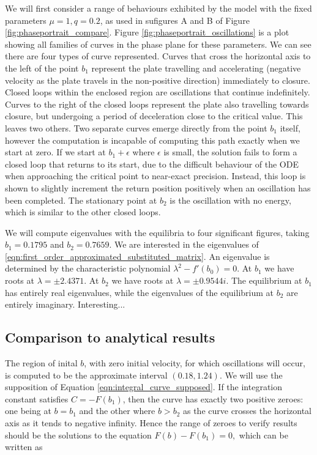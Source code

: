 \documentclass{article}
\begin{document}
We will first consider a range of behaviours exhibited by the model with the fixed parameters $\mu=1, q=0.2$,
as used in sufigures A and B of Figure \ref{fig:phaseportrait_compare}.
Figure \ref{fig:phaseportrait_oscillations} is a plot showing all families of curves in the phase plane for these parameters.
We can see there are four types of curve represented.
Curves that cross the horizontal axis to the left of the point $b_1$ represent the plate travelling and accelerating (negative velocity as the plate travels in the non-positive direction) immediately to closure.
Closed loops within the enclosed region are oscillations that continue indefinitely.
Curves to the right of the closed loops represent the plate also travelling towards closure,
but undergoing a period of deceleration close to the critical value.
This leaves two others. Two separate curves emerge directly from the point $b_1$ itself,
however the computation is incapable of computing this path exactly when we start at zero.
If we start at $b_1+\epsilon$ where $\epsilon$ is small,
the solution fails to form a closed loop that returns to its start,
due to the difficult behaviour of the ODE when approaching the critical point to near-exact precision.
Instead, this loop is shown to slightly increment the return position positively when an oscillation has been completed.
The stationary point at $b_2$ is the oscillation with no energy,
which is similar to the other closed loops.

We will compute eigenvalues with the equilibria to four significant figures, taking \(b_1 = 0.1795\) and \(b_2 = 0.7659\).
We are interested in the eigenvalues of \ref{eqn:first_order_approximated_substituted_matrix}.
An eigenvalue is determined by the characteristic polynomial \(\lambda^2 - f'(b_0) = 0\).
At \(b_1\) we have roots at \(\lambda = \pm 2.4371\).
At \(b_2\) we have roots at \(\lambda = \pm 0.9544 i\).
The equilibrium at $b_1$ has entirely real eigenvalues, while the eigenvalues of the equilibrium at $b_2$ are entirely imaginary.
Interesting...

\subsection{Comparison to analytical results}

The region of inital $b$, with zero initial velocity, for which oscillations will occur,
is computed to be the approximate interval $(0.18,1.24)$.
We will use the supposition of Equation \ref{eqn:integral_curve_supposed}.
If the integration constant satisfies $C = -F(b_1)$,
then the curve has exactly two positive zeroes:
one being at $b=b_1$ and the other where $b>b_2$ as the curve crosses the horizontal axis as it tends to negative infinity.
Hence the range of zeroes to verify results should be the solutions to the equation $F(b)-F(b_1)=0,$ which can be written as
\end{document}

